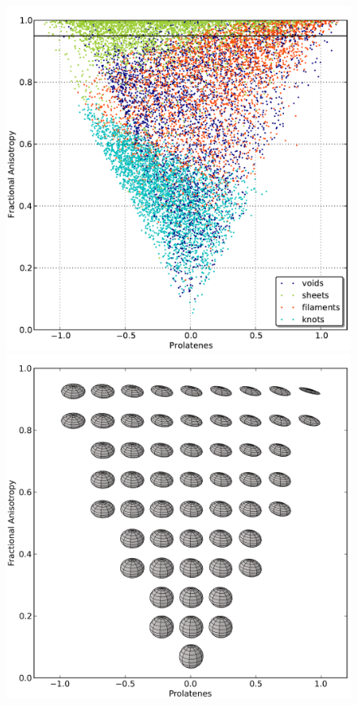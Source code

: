 \documentclass[a4,useAMS,usenatbib,usegraphicx]{latex/mn2e}
\begin{document}


\begin{flushleft}
\begin{figure}
\centering

  \includegraphics[trim = 0mm 1mm 0mm 1mm, clip, keepaspectratio=true,
  width=0.3\textheight]{./figures/FA_Prolatenes_Vweb.pdf}
  \includegraphics[trim = 0mm 1mm 0mm 1mm, clip, keepaspectratio=true,
  width=0.3\textheight]{./figures/FA_Prolatenes.png}  
  

\end{figure}
\end{flushleft}
\end{document}
